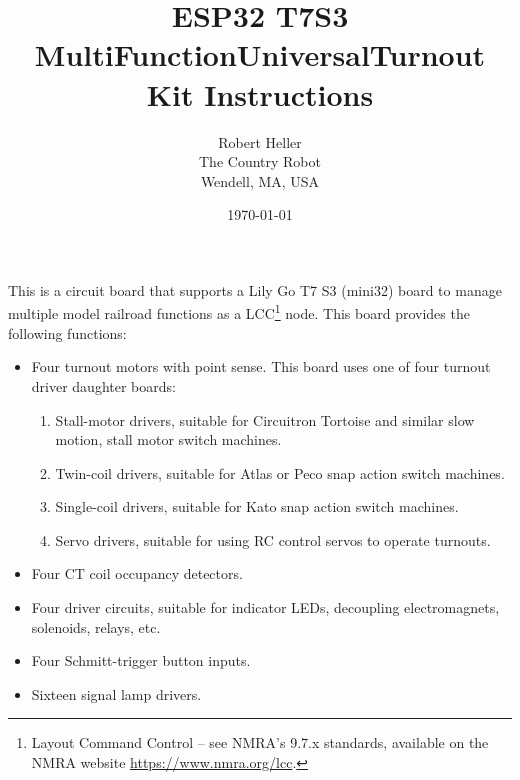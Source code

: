 \documentclass[12pt,twoside]{article}
\title{ESP32 T7S3 MultiFunctionUniversalTurnout Kit Instructions}
\author{Robert Heller \\ The Country Robot \\ Wendell, MA, USA}
\date{\today}
\begin{document}
\maketitle

This is a circuit board that supports a Lily Go T7 S3 (mini32) board to manage
multiple model railroad functions as a LCC\footnote{Layout Command Control --
see NMRA's 9.7.x standards, available on the NMRA website
\url{https://www.nmra.org/lcc}.} node. This board provides the following 
functions:

\begin{itemize}
\item Four turnout motors with point sense.  This board uses one of four 
turnout driver daughter boards:
\begin{enumerate}
\item Stall-motor drivers, suitable for Circuitron Tortoise and similar slow 
motion, stall motor switch machines.
\item Twin-coil drivers, suitable for Atlas or Peco snap action switch 
machines.
\item Single-coil drivers, suitable for Kato snap action switch machines.
\item Servo drivers, suitable for using RC control servos to operate turnouts.
\end{enumerate}
\item Four CT coil occupancy detectors.
\item Four driver circuits, suitable for indicator LEDs, decoupling 
electromagnets, solenoids, relays, etc.
\item Four Schmitt-trigger button inputs.
\item Sixteen signal lamp drivers.
\end{itemize}

\clearpage
\end{document}
